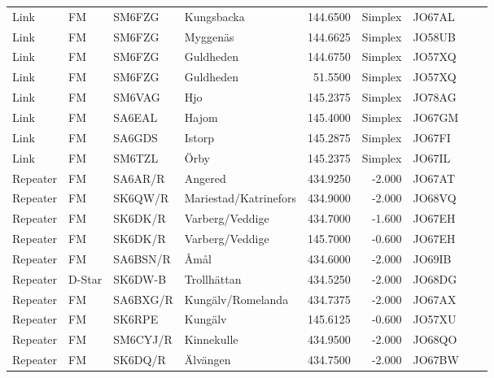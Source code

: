 \begin{longtable}{llllrrlcl}
	Link     & FM              & SM6FZG   & Kungsbacka            &   144.6500 &  Simplex & JO67AL &  &  \\
	Link     & FM              & SM6FZG   & Myggenäs              &   144.6625 &  Simplex & JO58UB &  &  \\
	Link     & FM              & SM6FZG   & Guldheden             &   144.6750 &  Simplex & JO57XQ &  &  \\
	Link     & FM              & SM6FZG   & Guldheden             &    51.5500 &  Simplex & JO57XQ &  &  \\
	Link     & FM              & SM6VAG   & Hjo                   &   145.2375 &  Simplex & JO78AG &  &  \\
	Link     & FM              & SA6EAL   & Hajom                 &   145.4000 &  Simplex & JO67GM &  &  \\
	Link     & FM              & SA6GDS   & Istorp                &   145.2875 &  Simplex & JO67FI &  &  \\
	Link     & FM              & SM6TZL   & Örby                  &   145.2375 &  Simplex & JO67IL &  &  \\
	Repeater & FM              & SA6AR/R  & Angered               &   434.9250 &   -2.000 & JO67AT &  &  \\
	Repeater & FM              & SK6QW/R  & Mariestad/Katrinefors &   434.9000 &   -2.000 & JO68VQ &  &  \\
	Repeater & FM              & SK6DK/R  & Varberg/Veddige       &   434.7000 &   -1.600 & JO67EH &  &  \\
	Repeater & FM              & SK6DK/R  & Varberg/Veddige       &   145.7000 &   -0.600 & JO67EH &  &  \\
	Repeater & FM              & SA6BSN/R & Åmål                  &   434.6000 &   -2.000 & JO69IB &  &  \\
	Repeater & D-Star          & SK6DW-B  & Trollhättan           &   434.5250 &   -2.000 & JO68DG &  &  \\
	Repeater & FM              & SA6BXG/R & Kungälv/Romelanda     &   434.7375 &   -2.000 & JO67AX &  &  \\
	Repeater & FM              & SK6RPE   & Kungälv               &   145.6125 &   -0.600 & JO57XU &  &  \\
	Repeater & FM              & SM6CYJ/R & Kinnekulle            &   434.9500 &   -2.000 & JO68QO &  &  \\
	Repeater & FM              & SK6DQ/R  & Älvängen              &   434.7500 &   -2.000 & JO67BW &  &  \\

\end{longtable}
